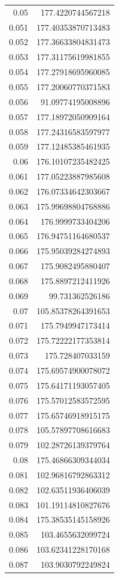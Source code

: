 \documentclass{mimosis}
\begin{document}
\begin{longtable}{rr}
0.05 & 177.4220744567218\\
0.051 & 177.40353870713483\\
0.052 & 177.36633804831473\\
0.053 & 177.31175619981855\\
0.054 & 177.27918695960085\\
0.055 & 177.20060770371583\\
0.056 & 91.09774195008896\\
0.057 & 177.18972050909164\\
0.058 & 177.24316583597977\\
0.059 & 177.12485385461935\\
0.06 & 176.10107235482425\\
0.061 & 177.05223887985608\\
0.062 & 176.07334642303667\\
0.063 & 175.99698804768886\\
0.064 & 176.9999733404206\\
0.065 & 176.94751164680537\\
0.066 & 175.95039284274893\\
0.067 & 175.9082495880407\\
0.068 & 175.8897212411926\\
0.069 & 99.731362526186\\
0.07 & 105.85378264391653\\
0.071 & 175.7949947173414\\
0.072 & 175.72222177353814\\
0.073 & 175.728407033159\\
0.074 & 175.69574900078072\\
0.075 & 175.64171193057405\\
0.076 & 175.57012583572595\\
0.077 & 175.65746918915175\\
0.078 & 105.57897708616683\\
0.079 & 102.28726139379764\\
0.08 & 175.46866309344034\\
0.081 & 102.96816792863312\\
0.082 & 102.63511936406039\\
0.083 & 101.19114810827676\\
0.084 & 175.38535145158926\\
0.085 & 103.4655632099724\\
0.086 & 103.62341228170168\\
0.087 & 103.9030792249824\\

\end{longtable}
\end{document}
